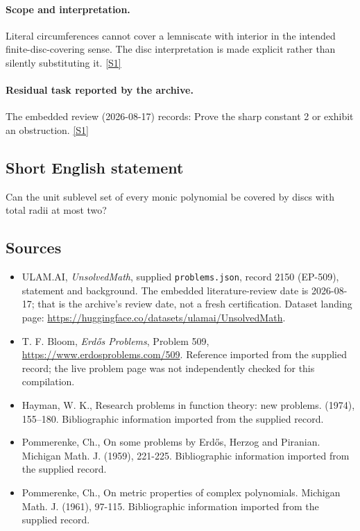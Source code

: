\documentclass[11pt,a4paper]{article}
\newcommand{\sref}[2]{\hyperlink{source:#1:#2}{[S#2]}}
\begin{document}
\paragraph{Scope and interpretation.}

Literal circumferences cannot cover a lemniscate with interior in the intended finite-disc-covering sense. The disc interpretation is made explicit rather than silently substituting it. \sref{2150}{1}

\paragraph{Residual task reported by the archive.}

The embedded review (2026-08-17) records: Prove the sharp constant 2 or exhibit an obstruction. \sref{2150}{1}

\subsection{Short English statement}

Can the unit sublevel set of every monic polynomial be covered by discs with total radii at most two?

\subsection{Sources}

{\small

\begin{itemize}

\item[\hypertarget{source:2150:1}{S1}] ULAM.AI, \emph{UnsolvedMath}, supplied \texttt{problems.json}, record 2150 (EP-509), statement and background. The embedded literature-review date is 2026-08-17; that is the archive’s review date, not a fresh certification. Dataset landing page: \url{https://huggingface.co/datasets/ulamai/UnsolvedMath}.

\item[\hypertarget{source:2150:2}{S2}] T. F. Bloom, \emph{Erdős Problems}, Problem 509, \url{https://www.erdosproblems.com/509}. Reference imported from the supplied record; the live problem page was not independently checked for this compilation.

\item[\hypertarget{source:2150:3}{S3}] Hayman, W. K., Research problems in function theory: new problems. (1974), 155--180. Bibliographic information imported from the supplied record.

\item[\hypertarget{source:2150:4}{S4}] Pommerenke, Ch., On some problems by Erd\H{o}s, Herzog and Piranian. Michigan Math. J. (1959), 221-225. Bibliographic information imported from the supplied record.

\item[\hypertarget{source:2150:5}{S5}] Pommerenke, Ch., On metric properties of complex polynomials. Michigan Math. J. (1961), 97-115. Bibliographic information imported from the supplied record.

\end{itemize}

}

\label{end:2150}
\end{document}
